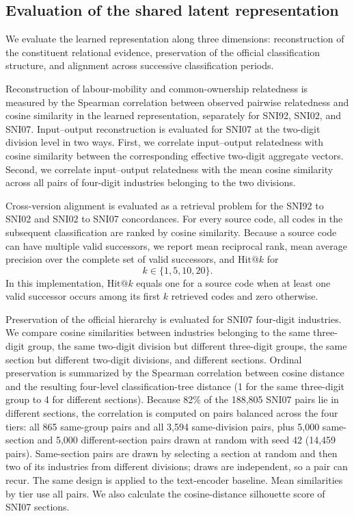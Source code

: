 \documentclass[9pt,twoside]{pnas-new}
\begin{document}
\subsection{Evaluation of the shared latent representation}
\label{subsec:embedding-evaluation}

We evaluate the learned representation along three dimensions: reconstruction
of the constituent relational evidence, preservation of the official
classification structure, and alignment across successive classification
periods.

Reconstruction of labour-mobility and common-ownership relatedness is measured
by the Spearman correlation between observed pairwise relatedness and cosine
similarity in the learned representation, separately for SNI92, SNI02, and
SNI07. Input--output reconstruction is evaluated for SNI07 at the two-digit
division level in two ways. First, we correlate input--output relatedness with
cosine similarity between the corresponding effective two-digit aggregate
vectors. Second, we correlate input--output relatedness with the mean cosine
similarity across all pairs of four-digit industries belonging to the two
divisions.

Cross-version alignment is evaluated as a retrieval problem for the SNI92 to
SNI02 and SNI02 to SNI07 concordances. For every source code, all codes in
the subsequent classification are ranked by cosine similarity. Because a
source code can have multiple valid successors, we report mean reciprocal
rank, mean average precision over the complete set of valid successors, and
\(\mathrm{Hit@}k\) for
\[
k\in\{1,5,10,20\}.
\]
In this implementation, \(\mathrm{Hit@}k\) equals one for a source code
when at least one valid successor occurs among its first \(k\) retrieved
codes and zero otherwise.

Preservation of the official hierarchy is evaluated for SNI07 four-digit
industries. We compare cosine similarities between industries belonging to
the same three-digit group, the same two-digit division but different
three-digit groups, the same section but different two-digit divisions, and
different sections. Ordinal preservation is summarized by the Spearman
correlation between cosine distance and the resulting four-level
classification-tree distance (1 for the same three-digit group to 4 for different
sections). Because 82\% of the 188,805 SNI07 pairs lie in different sections, the
correlation is computed on pairs balanced across the four tiers: all 865
same-group pairs and all 3,594 same-division pairs, plus 5,000 same-section and
5,000 different-section pairs drawn at random with seed 42 (14,459 pairs).
Same-section pairs are drawn by selecting a section at random and then two of its
industries from different divisions; draws are independent, so a pair can recur.
The same design is applied to the text-encoder baseline. Mean similarities by tier
use all pairs. We also calculate the cosine-distance
silhouette score of SNI07 sections.
\end{document}
